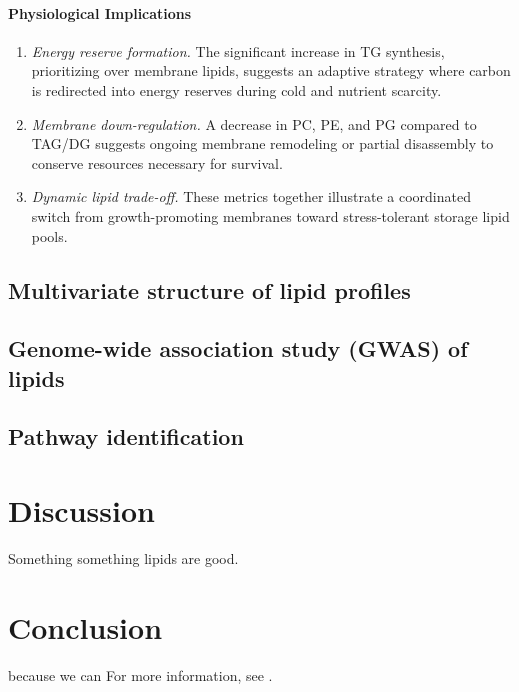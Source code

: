 \documentclass[10pt,letterpaper]{article}
\begin{document}
\paragraph{Physiological Implications}
\begin{enumerate}
  \item \textit{Energy reserve formation.}  The significant increase in TG synthesis, prioritizing over membrane lipids, suggests an adaptive strategy where carbon is redirected into energy reserves during cold and nutrient scarcity.
  \item \textit{Membrane down-regulation.}  A decrease in PC, PE, and PG compared to TAG/DG suggests ongoing membrane remodeling or partial disassembly to conserve resources necessary for survival.
  \item \textit{Dynamic lipid trade-off.}  These metrics together illustrate a coordinated switch from growth-promoting membranes toward stress-tolerant storage lipid pools.
\end{enumerate}

\subsection*{Multivariate structure of lipid profiles}

\subsection*{Genome-wide association study (GWAS) of lipids}

\subsection*{Pathway identification}








\section*{Discussion}
Something something lipids are good. 


\section*{Conclusion}

because we can For more information, see .
\end{document}
